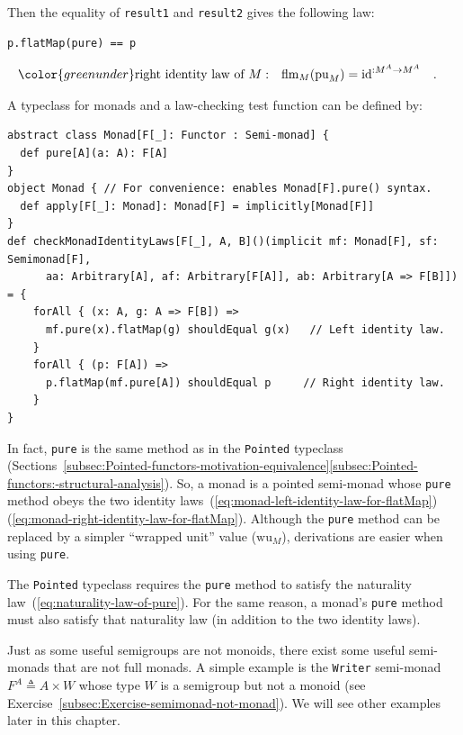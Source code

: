 \noindent \vspace{0.1\baselineskip}
Then the equality of \lstinline!result1! and \lstinline!result2!
gives the following law:
\begin{lstlisting}
p.flatMap(pure) == p
\end{lstlisting}
\begin{align}
{\color{greenunder}\text{right identity law of }M:}\quad & \text{flm}_{M}(\text{pu}_{M})=\text{id}^{:M^{A}\rightarrow M^{A}}\quad.\label{eq:monad-right-identity-law-for-flatMap}
\end{align}

A typeclass for monads and
a law-checking test function can be defined by:
\begin{lstlisting}
abstract class Monad[F[_]: Functor : Semi-monad] {
  def pure[A](a: A): F[A]
}
object Monad { // For convenience: enables Monad[F].pure() syntax.
  def apply[F[_]: Monad]: Monad[F] = implicitly[Monad[F]]
}
def checkMonadIdentityLaws[F[_], A, B]()(implicit mf: Monad[F], sf: Semimonad[F],
      aa: Arbitrary[A], af: Arbitrary[F[A]], ab: Arbitrary[A => F[B]]) = {
    forAll { (x: A, g: A => F[B]) =>               
      mf.pure(x).flatMap(g) shouldEqual g(x)   // Left identity law.
    }
    forAll { (p: F[A]) =>               
      p.flatMap(mf.pure[A]) shouldEqual p     // Right identity law.
    }
}
\end{lstlisting}

In fact, \lstinline!pure! is the same method as in the \lstinline!Pointed!
typeclass (Sections~\ref{subsec:Pointed-functors-motivation-equivalence}\textendash \ref{subsec:Pointed-functors:-structural-analysis}).
So, a monad is a pointed semi-monad whose \lstinline!pure! method
obeys the two identity laws~(\ref{eq:monad-left-identity-law-for-flatMap})\textendash (\ref{eq:monad-right-identity-law-for-flatMap}).
Although the \lstinline!pure! method can be replaced by a simpler
\textsf{``}wrapped unit\textsf{''} value ($\text{wu}_{M}$), derivations are easier
when using \lstinline!pure!.

The \lstinline!Pointed! typeclass requires the \lstinline!pure!
method to satisfy the naturality law~(\ref{eq:naturality-law-of-pure}).
For the same reason, a monad\textsf{'}s \lstinline!pure! method must also
satisfy that naturality law (in addition to the two identity laws).

Just as some useful semigroups are not monoids, there exist some useful
semi-monads that are not full monads. A simple example is the \lstinline!Writer!
semi-monad $F^{A}\triangleq A\times W$ whose type $W$ is a semigroup
but not a monoid (see Exercise~\ref{subsec:Exercise-semimonad-not-monad}).
We will see other examples later in this chapter.

